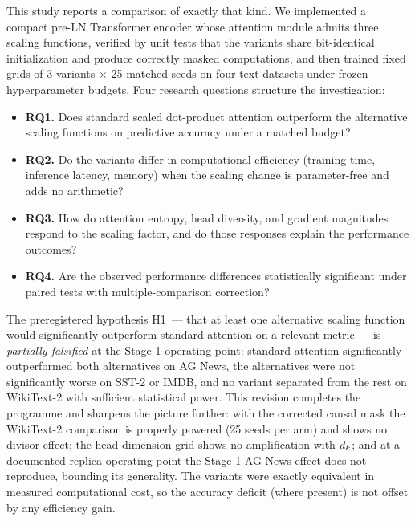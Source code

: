 This study reports a comparison of exactly that kind. We implemented a compact
pre-LN Transformer encoder \cite{xiong2020,ba2016} whose attention module admits
three scaling functions, verified by unit tests that the variants share
bit-identical initialization and produce correctly masked computations, and then
trained fixed grids of 3 variants $\times$ 25 matched seeds on four text datasets
under frozen hyperparameter budgets. Four research questions structure the
investigation:

\begin{itemize}[leftmargin=1.8em]
  \item \textbf{RQ1.} Does standard scaled dot-product attention outperform the
        alternative scaling functions on predictive accuracy under a matched
        budget?
  \item \textbf{RQ2.} Do the variants differ in computational efficiency
        (training time, inference latency, memory) when the scaling change is
        parameter-free and adds no arithmetic?
  \item \textbf{RQ3.} How do attention entropy, head diversity, and gradient
        magnitudes respond to the scaling factor, and do those responses explain
        the performance outcomes?
  \item \textbf{RQ4.} Are the observed performance differences statistically
        significant under paired tests with multiple-comparison correction?
\end{itemize}

The preregistered hypothesis H1~--- that at least one alternative scaling
function would significantly outperform standard attention on a relevant metric
--- is \emph{partially falsified} at the Stage-1 operating point: standard
attention significantly outperformed both alternatives on AG News, the
alternatives were not significantly worse on SST-2 or IMDB, and no variant
separated from the rest on WikiText-2 with sufficient statistical power. This
revision completes the programme and sharpens the picture further: with the
corrected causal mask the WikiText-2 comparison is properly powered (25 seeds
per arm) and shows no divisor effect; the head-dimension grid shows no
amplification with $d_k$; and at a documented replica operating point the
Stage-1 AG News effect does not reproduce, bounding its generality. The
variants were exactly equivalent in measured computational cost, so the
accuracy deficit (where present) is not offset by any efficiency gain.

